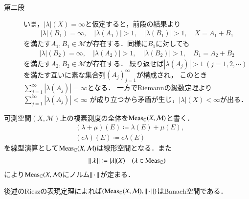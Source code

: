 \begin{prf}
\begin{description}
		\item[第二段]
			いま，$|\lambda|(X) = \infty$と仮定すると，前段の結果より
			\begin{align}
				|\lambda|(B_1) = \infty, \quad |\lambda(A_1)| > 1, \quad |\lambda(B_1)| > 1,
				\quad X = A_1 + B_1
			\end{align}
			を満たす$A_1,B_1 \in \mathcal{M}$が存在する．同様に$B_1$に対しても
			\begin{align}
				|\lambda|(B_2) = \infty, \quad |\lambda(A_2)| > 1, \quad |\lambda(B_2)| > 1,
				\quad B_1 = A_2 + B_2
			\end{align}
			を満たす$A_2,B_2 \in \mathcal{M}$が存在する．
			繰り返せば$|\lambda(A_j)| > 1\ (j=1,2,\cdots)$
			を満たす互いに素な集合列$(A_j)_{j=1}^{\infty}$が構成され，
			このとき$\sum_{j=1}^{\infty} |\lambda(A_j)| = \infty$となる．
			一方でRiemannの級数定理より$\sum_{j=1}^{\infty} |\lambda(A_j)| < \infty$
			が成り立つから矛盾が生じ，$|\lambda|(X) < \infty$が出る．
			\QED
		\end{description}
	\end{prf}
	
	\begin{screen}
		\begin{thm}
			可測空間$(X,\mathcal{M})$上の複素測度の全体を$\mathrm{Meas}_{\mathbb{C}}(X,\mathcal{M})$と書く．
			\begin{align}
				&(\lambda + \mu)(E) \coloneqq \lambda(E) + \mu(E), \\
				&(c\lambda)(E) \coloneqq c\lambda(E)
				\label{complex_measure_linear}
			\end{align}
			を線型演算として$\mathrm{Meas}_{\mathbb{C}}(X,\mathcal{M})$は線形空間となる．また
			\begin{align}
				\left\|\, \lambda\, \right\|_{} \coloneqq |\lambda|(X) \quad (\lambda \in \mathrm{Meas}_{\mathbb{C}})
			\end{align}
			により$\mathrm{Meas}_{\mathbb{C}}(X,\mathcal{M})$にノルム$\left\|\, \cdot\, \right\|_{}$が定まる．
		\end{thm}
	\end{screen}
	
	後述のRieszの表現定理によれば$(\mathrm{Meas}_{\mathbb{C}}(X,\mathcal{M}),\left\|\, \cdot\, \right\|_{})$はBanach空間である．
	
